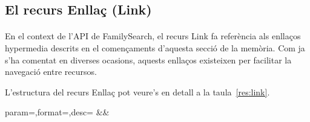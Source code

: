 \subsection{El recurs Enllaç (Link)}

    \paragraph{}
    En el context de l'API de FamilySearch, el recurs Link fa referència als enllaços hypermedia descrits en el començaments d'aquesta secció de la memòria. Com ja s'ha comentat en diverses ocasions, aquests enllaços existeixen per facilitar la navegació entre recursos.

    L'estructura del recurs Enllaç pot veure's en detall a la taula~\ref{res:link}.

    \begin{center}
             {param=\param,format=\format,desc=\desc}
             {\param&\format&\desc}
     \end{center}
